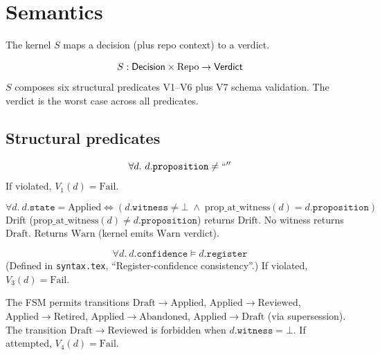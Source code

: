 
\section{Semantics}

The kernel $S$ maps a decision (plus repo context) to a verdict.

\begin{definition}[Kernel $S$]
$$S : \mathsf{Decision} \times \mathrm{Repo} \to \mathsf{Verdict}$$
$S$ composes six structural predicates V1--V6 plus V7 schema
validation. The verdict is the worst case across all predicates.
\end{definition}

\subsection{Structural predicates}

\begin{proposition}[V1: structure]
$$\forall d.\ d.\mathtt{proposition} \neq \mathtt{``''}$$
If violated, $V_1(d) = \mathrm{Fail}$.
\end{proposition}

\begin{proposition}[V2: lifecycle]
$$\forall d.\ d.\mathtt{state} = \mathrm{Applied} \iff (d.\mathtt{witness} \neq \bot \;\wedge\; \mathrm{prop\_at\_witness}(d) = d.\mathtt{proposition})$$
Drift ($\mathrm{prop\_at\_witness}(d) \neq d.\mathtt{proposition}$) returns
$\mathrm{Drift}$. No witness returns $\mathrm{Draft}$. Returns
$\mathrm{Warn}$ (kernel emits $\mathrm{Warn}$ verdict).
\end{proposition}

\begin{proposition}
$$\forall d.\ d.\mathtt{confidence} \models d.\mathtt{register}$$
(Defined in \texttt{syntax.tex}, ``Register-confidence consistency''.)
If violated, $V_3(d) = \mathrm{Fail}$.
\end{proposition}

\begin{proposition}
The FSM permits transitions
$\mathrm{Draft} \to \mathrm{Applied}$, $\mathrm{Applied} \to \mathrm{Reviewed}$,
$\mathrm{Applied} \to \mathrm{Retired}$, $\mathrm{Applied} \to \mathrm{Abandoned}$,
$\mathrm{Applied} \to \mathrm{Draft}$ (via supersession).
The transition $\mathrm{Draft} \to \mathrm{Reviewed}$ is forbidden when
$d.\mathtt{witness} = \bot$. If attempted, $V_4(d) = \mathrm{Fail}$.
\end{proposition}

